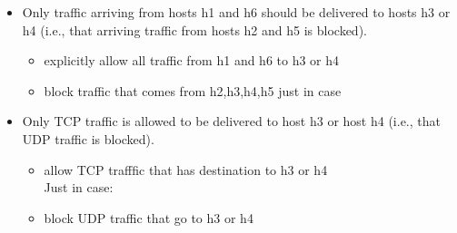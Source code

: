 \documentclass[11pt]{article}
\newenvironment{problem}[2][Problem]{\begin{trivlist}
\item[\hskip \labelsep {\bfseries #1}\hskip \labelsep {\bfseries #2.}]}{\end{trivlist}}
\begin{document}
\begin{problem}{2}
\end{problem}
\begin{itemize}
	\item Only traffic arriving from hosts h1 and h6 should be delivered to hosts h3 or h4 (i.e., that arriving traffic from hosts h2 and h5 is blocked).
	\\
	\begin{itemize}
		\item explicitly allow all traffic from h1 and h6 to h3 or h4
		\item block traffic that comes from h2,h3,h4,h5 just in case
	\end{itemize}
	\item Only TCP traffic is allowed to be delivered to host h3 or host h4 (i.e., that UDP traffic is blocked). \\
	\begin{itemize}
		\item allow TCP trafffic that has destination to h3 or h4
		\\
		Just in case:
		\item block UDP traffic that go to h3 or h4

\end{itemize}
\end{itemize}
\end{document}
